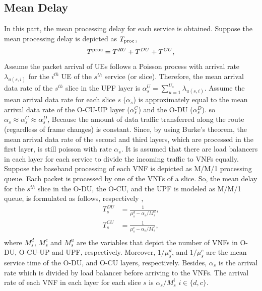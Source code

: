 \documentclass[conference]{IEEEtran}
\begin{document}
\subsection{Mean Delay}
In this part, the mean processing delay for each service is obtained.
Suppose the mean processing delay is depicted as $T_{\text{\text{proc}}}$,
\begin{equation}
T^{\text{\text{proc}}} =  T^{RU} + T^{DU} + T^{CU},
\end{equation}
Assume the packet arrival of UEs follows a Poisson process with arrival rate $\lambda_{u(s,i)}$ for the $i^{th}$ UE of the $s^{th}$ service (or slice).
Therefore, the mean arrival data rate of the $s^{th}$ slice in the UPF layer is $\alpha_{s}^U = \sum_{u=1}^{U_s}\lambda_{u(s,i)}$.
Assume the mean arrival data rate for each slice $s$ ($\alpha_{s}$) is approximately equal to the mean arrival data rate of the O-CU-UP layer ($\alpha_{s}^C$) and the O-DU ($\alpha_{s}^D$). so $\alpha_{s} \approx \alpha_{s}^C \approx \alpha_{s}^D$,
Because the amount of data traffic transferred along the route (regardless of frame changes) is constant.
Since, by using Burke’s theorem, the mean arrival data rate of the second and third layers, which are processed in the first layer, is still poisson with rate $\alpha_{s}$.
It is assumed that there are load balancers in each layer for each service to divide the incoming traffic to VNFs equally. %
Suppose the baseband processing of each VNF is depicted as M/M/1 processing queue.
Each packet is processed by one of the VNFs of a slice. So, the mean delay for the $s^{th}$ slice in the O-DU, the O-CU, and the UPF is modeled as M/M/1 queue, is formulated as follows, respectively \cite{SystemCostMinimization,luong2018joint,luong2018novel},
\begin{equation}
\begin{split}
T_{s}^{DU} &= \frac{1}{\mu_s^d - \alpha_{s}/{M_s^{d}}},\\
T_{s}^{CU} &= \frac{1}{\mu_s^c - \alpha_{s}/{M_s^{c}}},\\
\end{split}
\end{equation}
where $M_s^{d}$, $M_s^{c}$ and 
$M_s^{u}$ are the variables that depict the number of VNFs in O-DU, O-CU-UP and UPF, respectively. 
Moreover, $1/\mu_s^d$, and $1/\mu_s^c$ are the mean service time of the O-DU, and O-CU layers, respectively.
Besides, $\alpha_{s}$ is the  arrival rate which is divided
by load balancer before arriving to the VNFs. The arrival rate of each VNF in each layer for each slice 
$s$ is $\alpha_{s}/{M_s^{i}}$ $ i \in \{d,c\}$.
\end{document}
